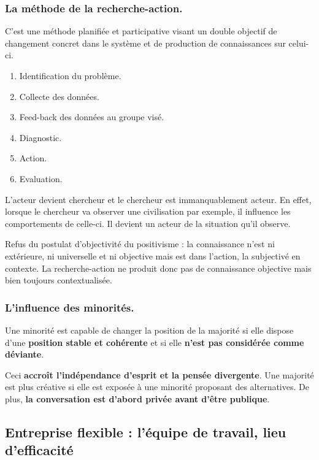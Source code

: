 \documentclass[12pt]{article}
\begin{document}
	\subsubsection*{La méthode de la recherche-action.}
	
	C'est une méthode planifiée et participative visant un double objectif de changement concret dans le système et de production de connaissances sur celui-ci.
	\begin{enumerate}
	\item Identification du problème.
	\item Collecte des données.
	\item Feed-back des données au groupe visé.
	\item Diagnostic.
	\item Action.
	\item Evaluation. \newline
	\end{enumerate}
	
	L'acteur  devient  chercheur  et  le  chercheur  est  immanquablement  acteur. En effet, lorsque le chercheur va observer une civilisation par exemple, il influence les comportements  de  celle-ci.  Il  devient  un  acteur  de  la  situation  qu'il  observe. \newline
	
	Refus  du  postulat  d'objectivité  du  positivisme  :  la  connaissance  n'est  ni  extérieure,  ni universelle  et  ni  objective  mais  est  dans  l'action,  la  subjectivé  en  contexte. La  recherche-action  ne  produit  donc  pas  de  connaissance  objective  mais  bien  toujours contextualisée.
	
	\subsubsection*{L'influence des minorités.}
	
	Une minorité est capable de changer la position de la majorité si elle dispose d'une \textbf{position stable et cohérente} et si elle \textbf{n'est pas considérée comme déviante}. \newline
	
	Ceci \textbf{accroît l'indépendance d'esprit et la pensée divergente}. Une majorité est plus créative si elle est exposée à une minorité proposant des alternatives. De plus, \textbf{la conversation est d'abord privée avant d'être publique}.
	
	\subsection{Entreprise flexible : l’équipe de travail, lieu d’efficacité}
\end{document}
